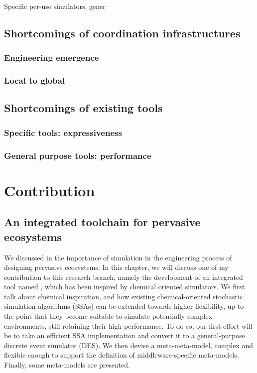 \documentclass[12pt,a4paper,twoside,openright]{book}
\begin{document}
Specific per-use simulators, gener

\chapter{Shortcomings of coordination infrastructures}
\section{Engineering emergence}
\section{Local to global}
\chapter{Shortcomings of existing tools}
\section{Specific tools: expressiveness}
\section{General purpose tools: performance}

\part{Contribution}
\label{contribution}
\chapter{An integrated toolchain for pervasive ecosystems}

We discussed in  the importance of simulation in the engineering process of designing pervasive ecosystems.
%
In this chapter, we will discuss one of my contribution to this research branch, namely the development of an integrated tool named \alchemist{}, which has been inspired by chemical oriented simulators.
%
We first talk about chemical inspiration, and how existing chemical-oriented stochastic simulation algorithms (SSAs) can be extended towards higher flexibility, up to the point that they become suitable to simulate potentially complex environments, still retaining their high performance.
%
To do so, our first effort will be to take an efficient SSA implementation and convert it to a general-purpose discrete event simulator (DES).
%
We then devise a meta-meta-model, complex and flexible enough to support the definition of middleware-specific meta-models.
%
Finally, some meta-models are presented.
%
\end{document}
